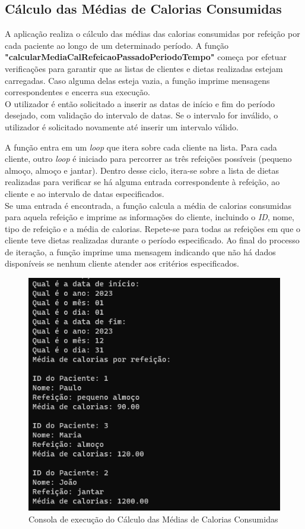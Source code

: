 \documentclass{article}
\begin{document}
\subsection{Cálculo das Médias de Calorias Consumidas}
A aplicação realiza o cálculo das médias das calorias consumidas por refeição por cada paciente ao longo de um determinado período.
A função \textbf{"calcularMediaCalRefeicaoPassadoPeriodoTempo"} começa por efetuar verificações para garantir que as listas de clientes e dietas realizadas estejam carregadas. Caso alguma delas esteja vazia, a função imprime mensagens correspondentes e encerra sua execução.\\

O utilizador é então solicitado a inserir as datas de início e fim do período desejado, com validação do intervalo de datas. Se o intervalo for inválido, o utilizador é solicitado novamente até inserir um intervalo válido.

A função entra em um \emph{loop} que itera sobre cada cliente na lista. Para cada cliente, outro \emph{loop} é iniciado para percorrer as três refeições possíveis (pequeno almoço, almoço e jantar). Dentro desse ciclo, itera-se sobre a lista de dietas realizadas para verificar se há alguma entrada correspondente à refeição, ao cliente e ao intervalo de datas especificados.\\

Se uma entrada é encontrada, a função calcula a média de calorias consumidas para aquela refeição e imprime as informações do cliente, incluindo o \textit{ID}, nome, tipo de refeição e a média de calorias. Repete-se para todas as refeições em que o cliente teve dietas realizadas durante o período especificado.
Ao final do processo de iteração, a função imprime uma mensagem indicando que não há dados disponíveis se nenhum cliente atender aos critérios especificados.

\begin{figure}[hbt!]
    \centering
    \includegraphics[width=0.8\linewidth]{Ponto5.png}
    \caption{Consola de execução do Cálculo das Médias de Calorias Consumidas}
    \label{fig:enter-label}
\end{figure}
\end{document}
